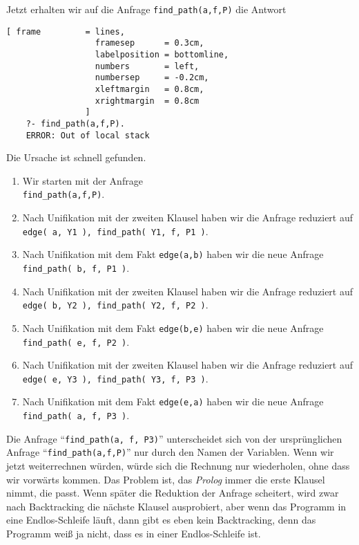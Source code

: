 Jetzt erhalten wir auf die Anfrage \texttt{find\_path(a,f,P)} die Antwort
\begin{Verbatim}[ frame         = lines, 
                  framesep      = 0.3cm, 
                  labelposition = bottomline,
                  numbers       = left,
                  numbersep     = -0.2cm,
                  xleftmargin   = 0.8cm,
                  xrightmargin  = 0.8cm
                ]
    ?- find_path(a,f,P).
    ERROR: Out of local stack
\end{Verbatim}
Die Ursache ist schnell gefunden.
\begin{enumerate}
\item Wir starten mit der Anfrage \\[0.1cm]
      \hspace*{1.3cm} \texttt{find\_path(a,f,P)}.
\item Nach Unifikation mit der zweiten Klausel haben wir die Anfrage reduziert auf \\[0.1cm]
      \hspace*{1.3cm} 
      \texttt{edge( a, Y1 ), find\_path( Y1, f, P1 )}.
\item Nach Unifikation mit dem Fakt \texttt{edge(a,b)} haben wir die neue Anfrage \\[0.1cm]
      \hspace*{1.3cm} 
      \texttt{find\_path( b, f, P1 )}.
\item Nach Unifikation mit der zweiten Klausel haben wir die Anfrage reduziert auf \\[0.1cm]
      \hspace*{1.3cm} 
      \texttt{edge( b, Y2 ), find\_path( Y2, f, P2 )}.
\item Nach Unifikation mit dem Fakt \texttt{edge(b,e)} haben wir die neue Anfrage \\[0.1cm]
      \hspace*{1.3cm} 
      \texttt{find\_path( e, f, P2 )}.
\item Nach Unifikation mit der zweiten Klausel haben wir die Anfrage reduziert auf \\[0.1cm]
      \hspace*{1.3cm} 
      \texttt{edge( e, Y3 ), find\_path( Y3, f, P3 )}.
\item Nach Unifikation mit dem Fakt \texttt{edge(e,a)} haben wir die neue Anfrage \\[0.1cm]
      \hspace*{1.3cm} 
      \texttt{find\_path( a, f, P3 )}.
\end{enumerate}
Die Anfrage ``\texttt{find\_path(a, f, P3)}'' unterscheidet sich von der urspr\"{u}nglichen
Anfrage ``\texttt{find\_path(a,f,P)}'' nur durch den Namen der Variablen.  Wenn wir jetzt
weiterrechnen w\"{u}rden, w\"{u}rde sich die Rechnung nur wiederholen, ohne dass wir vorw\"{a}rts kommen.
Das Problem ist, das \textsl{Prolog} immer die erste
Klausel nimmt, die passt.  Wenn sp\"{a}ter die Reduktion der Anfrage scheitert, wird zwar nach
Backtracking die n\"{a}chste Klausel ausprobiert, aber wenn das Programm in eine
Endlos-Schleife l\"{a}uft, dann gibt es eben kein Backtracking, denn das Programm weiß ja
nicht, dass es in einer Endlos-Schleife ist.

